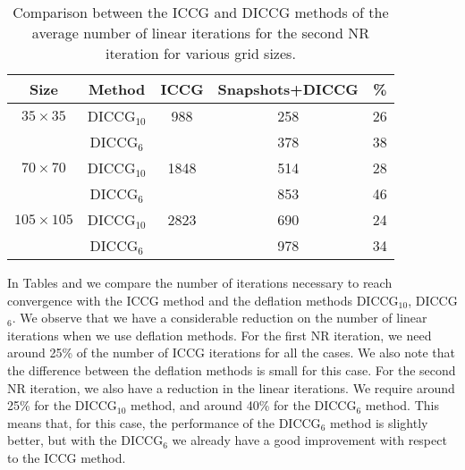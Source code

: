 \documentclass[12pt]{article}
\numberwithin{equation}{section}
\begin{document}
\begin{table}[!h]
\begin{minipage}{1\textwidth}
\vspace{-10pt}
\centering
\begin{tabular}{ |c|c|c|c|c|} 

\hline
Size&Method& ICCG & Snapshots+DICCG &\% \\
\hline
$35\times35$ &DICCG$_{10}$&988 &258  &26 \\
&DICCG$_6$& & 378 & 38\\
\hline
$70\times70$ &DICCG$_{10}$& 1848& 514 &28 \\
 &DICCG$_6$& &853  &46 \\
\hline
$105\times105$ &DICCG$_{10}$& 2823&690  &24 \\
 &DICCG$_6$& & 978 &34 \\
 \hline
 \end{tabular}
\caption{Comparison between the ICCG and DICCG methods of the average number of linear iterations for the second NR iteration for various grid sizes. }\label{table:litertots2}
\end{minipage}
\end{table}

In Tables \label{table:litertots1} and \label{table:litertots2} we compare the number of iterations necessary to reach convergence with the ICCG method and the deflation methods DICCG$_{10}$, DICCG$_6$. We observe that we have a considerable reduction on the number of linear iterations when we use deflation methods. For the first NR iteration, we need around 25\% of the number of ICCG iterations for all the cases. We also note that the difference between the deflation methods is small for this case. For the second NR iteration, we also have a reduction in the linear iterations. We require around 25\% for the DICCG$_{10}$ method, and around 40\% for the DICCG$_6$ method. This means that, for this case, the performance of the DICCG$_6$ method is slightly better, but with the DICCG$_6$ we already have a good improvement with respect to the ICCG method.   \\ \\

\newpage
\end{document}

